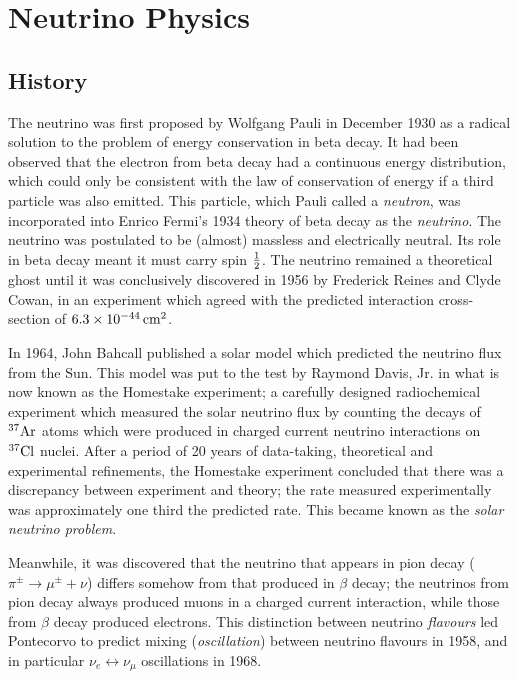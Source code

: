 \chapter{Neutrino Physics}\label{chapter:NeutrinoPhysics}

\section{History}
The neutrino was first proposed by Wolfgang Pauli in December 1930 as a radical solution to the problem of energy conservation in beta decay. It had been observed that the electron from beta decay had a continuous energy distribution, which could only be consistent with the law of conservation of energy if a third particle was also emitted. This particle, which Pauli called a \emph{neutron}, was incorporated into Enrico Fermi's 1934 theory of beta decay as the \emph{neutrino}\citep{Fermi1934,Wilson1968}. The neutrino was postulated to be (almost) massless and electrically neutral. Its role in beta decay meant it must carry spin $\frac{1}{2}$. The neutrino remained a theoretical ghost until it was conclusively discovered in 1956 by Frederick Reines and Clyde Cowan\citep{Reines1956}, in an experiment which agreed with the predicted interaction cross-section of $6.3\times 10^{-44} \,\mathrm{cm}^2$.

In 1964, John Bahcall published a solar model which predicted the neutrino flux from the Sun\citep{Bahcall1964}. This model was put to the test by Raymond Davis, Jr. in what is now known as the Homestake experiment\citep{Davis1964}; a carefully designed radiochemical experiment which measured the solar neutrino flux by counting the decays of $^{37}\mathrm{Ar}$ atoms which were produced in charged current neutrino interactions on $^{37}\mathrm{Cl}$ nuclei. After a period of 20 years of data-taking, theoretical and experimental refinements, the Homestake experiment concluded that there was a discrepancy between experiment and theory; the rate measured experimentally was approximately one third the predicted rate. This became known as the \emph{solar neutrino problem}.

Meanwhile, it was discovered that the neutrino that appears in pion decay ($\pi^\pm \rightarrow \mu^\pm + \nu$) differs somehow from that produced in $\beta$ decay\citep{Danby1962}; the neutrinos from pion decay always produced muons in a charged current interaction, while those from $\beta$ decay produced electrons. This distinction between neutrino \emph{flavours} led Pontecorvo to predict mixing (\emph{oscillation}) between neutrino flavours in 1958\citep{Pontecorvo1958}, and in particular $\nu_e \leftrightarrow \nu_\mu$ oscillations in 1968\citep{Pontecorvo1968}.

